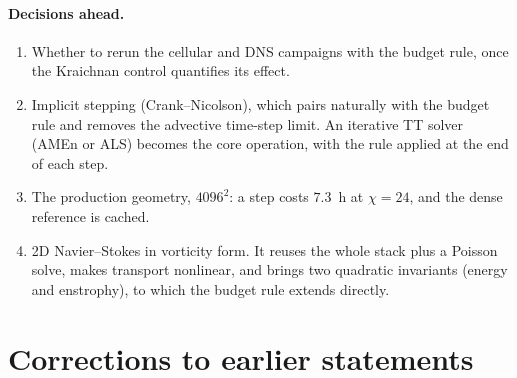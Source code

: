\documentclass[aps,prfluids,reprint,onecolumn,amsmath,amssymb,nofootinbib,floatfix]{revtex4-2}
\begin{document}
\paragraph{Decisions ahead.}
\begin{enumerate}[leftmargin=*]
\item Whether to rerun the cellular and DNS campaigns with the budget rule,
      once the Kraichnan control quantifies its effect.
\item Implicit stepping (Crank--Nicolson), which pairs naturally with the
      budget rule and removes the advective time-step limit. An iterative TT
      solver (AMEn or ALS) becomes the core operation, with the rule applied at
      the end of each step.
\item The production geometry, $4096^2$: a step costs $7.3$~h at $\chi=24$,
      and the dense reference is cached.
\item 2D Navier--Stokes in vorticity form. It reuses the whole stack plus a
      Poisson solve, makes transport nonlinear, and brings two quadratic
      invariants (energy and enstrophy), to which the budget rule extends
      directly.
\end{enumerate}

\section{Corrections to earlier statements}
\end{document}
